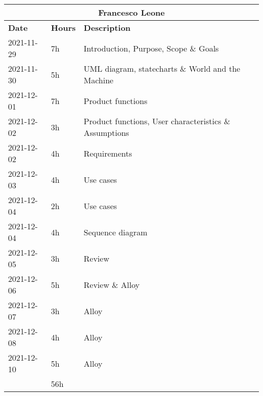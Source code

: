 \begin{table}[H]
    \centering
    \begin{tabular}{|l|l|l|}
        \multicolumn{3}{c}{\textbf{Francesco Leone}}                      \\
        \hline
        \textbf{Date} & \textbf{Hours} & \textbf{Description}              \\\hline
        2021-11-29    & 7h             & Introduction, Purpose, Scope \& Goals                  \\\hline
        2021-11-30    & 5h             & UML diagram, statecharts \& World and the Machine      \\\hline
        2021-12-01    & 7h             & Product functions                                      \\\hline
        2021-12-02    & 3h             & Product functions, User characteristics \& Assumptions \\\hline
        2021-12-02    & 4h             & Requirements                                           \\\hline
        2021-12-03    & 4h             & Use cases                                              \\\hline
        2021-12-04    & 2h             & Use cases                                              \\\hline
        2021-12-04    & 4h             & Sequence diagram                                       \\\hline
        2021-12-05    & 3h             & Review                                                 \\\hline
        2021-12-06    & 5h             & Review \& Alloy                                        \\\hline
        2021-12-07    & 3h             & Alloy                                                  \\\hline
        2021-12-08    & 4h             & Alloy                                                  \\\hline
        2021-12-10    & 5h             & Alloy                                                  \\\hline\hline
                      & 56h            &                                                        \\\hline
    \end{tabular}
\end{table}